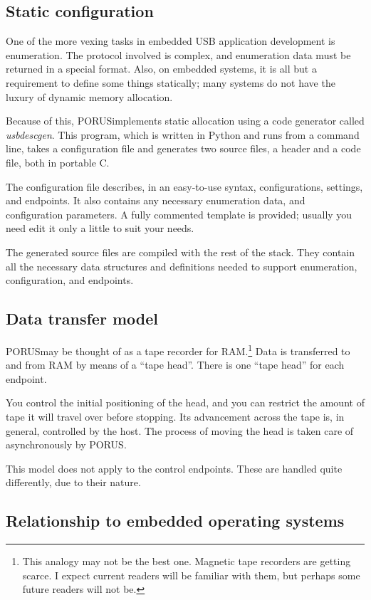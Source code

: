 \documentclass[10pt]{article}
\newcommand{\porus}{PORUS}
\newcommand{\exe}[1]{\textsl{#1}}
\begin{document}
\subsection{Static configuration}

One of the more vexing tasks in embedded USB application development is enumeration.  The protocol involved is complex, and enumeration data must be returned in a special format.  Also, on embedded systems, it is all but a requirement to define some things statically; many systems do not have the luxury of dynamic memory allocation.

Because of this, \porus implements static allocation using a code generator called \exe{usbdescgen}.  This program, which is written in Python and runs from a command line, takes a configuration file and generates two source files, a header and a code file, both in portable C.

The configuration file describes, in an easy-to-use syntax, configurations, settings, and endpoints.  It also contains any necessary enumeration data, and configuration parameters.  A fully commented template is provided; usually you need edit it only a little to suit your needs.

The generated source files are compiled with the rest of the stack.  They contain all the necessary data structures and definitions needed to support enumeration, configuration, and endpoints.

\subsection{Data transfer model}

\porus may be thought of as a tape recorder for RAM.\footnote{This analogy may not be the best one.  Magnetic tape recorders are getting scarce.  I expect current readers will be familiar with them, but perhaps some future readers will not be.}  Data is transferred to and from RAM by means of a ``tape head''.  There is one ``tape head'' for each endpoint. 

You control the initial positioning of the head, and you can restrict the amount of tape it will travel over before stopping.  Its advancement across the tape is, in general, controlled by the host.  The process of moving the head is taken care of asynchronously by \porus.

This model does not apply to the control endpoints.  These are handled quite differently, due to their nature.

\subsection{Relationship to embedded operating systems}
\end{document}
